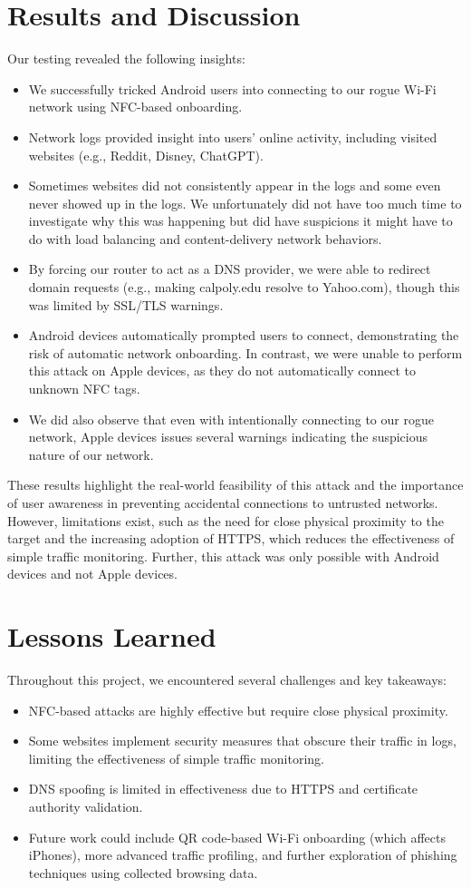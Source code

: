 \documentclass[sigconf]{acmart}
\begin{document}
\section{Results and Discussion}
Our testing revealed the following insights:
\begin{itemize}
    \item We successfully tricked Android users into connecting to our rogue Wi-Fi network using NFC-based onboarding.
    \item Network logs provided insight into users’ online activity, including visited websites (e.g., Reddit, Disney, ChatGPT).
    \item Sometimes websites did not consistently appear in the logs and some even never showed up in the logs. We unfortunately did not have too much time to investigate why this was happening but did have suspicions it might have to do with load balancing and content-delivery network behaviors.
    \item By forcing our router to act as a DNS provider, we were able to redirect domain requests (e.g., making calpoly.edu resolve to Yahoo.com), though this was limited by SSL/TLS warnings.
    \item Android devices automatically prompted users to connect, demonstrating the risk of automatic network onboarding. In contrast, we were unable to perform this attack on Apple devices, as they do not automatically connect to unknown NFC tags.
    \item We did also observe that even with intentionally connecting to our rogue network, Apple devices issues several warnings indicating the suspicious nature of our network.
\end{itemize}

These results highlight the real-world feasibility of this attack and the importance of user awareness in preventing accidental connections to untrusted networks. However, limitations exist, such as the need for close physical proximity to the target and the increasing adoption of HTTPS, which reduces the effectiveness of simple traffic monitoring. Further, this attack was only possible with Android devices and not Apple devices.

\section{Lessons Learned}
Throughout this project, we encountered several challenges and key takeaways:
\begin{itemize}
    \item NFC-based attacks are highly effective but require close physical proximity.
    \item Some websites implement security measures that obscure their traffic in logs, limiting the effectiveness of simple traffic monitoring.
    \item DNS spoofing is limited in effectiveness due to HTTPS and certificate authority validation.
    \item Future work could include QR code-based Wi-Fi onboarding (which affects iPhones), more advanced traffic profiling, and further exploration of phishing techniques using collected browsing data.
\end{itemize}
\end{document}

